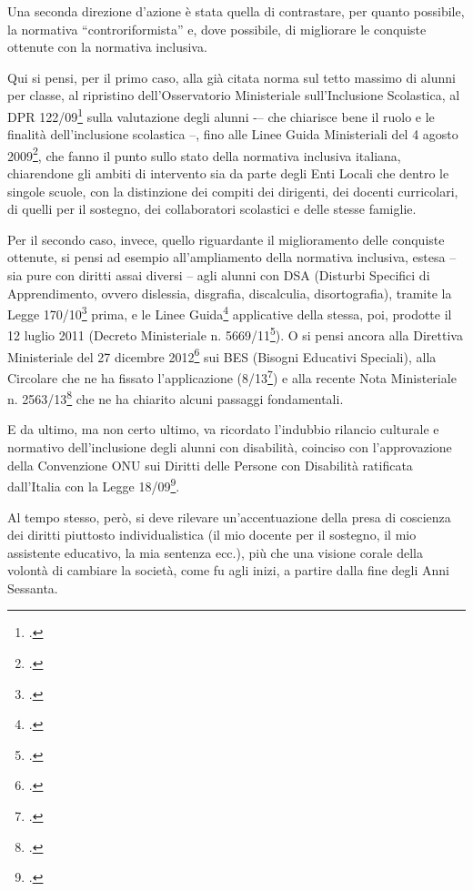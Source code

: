 Una seconda direzione d'azione è stata quella di contrastare, per quanto possibile, la normativa “controriformista” e, dove possibile, di migliorare le conquiste ottenute con la normativa inclusiva.

Qui si pensi, per il primo caso, alla già citata norma sul tetto massimo di alunni per classe, al ripristino dell'Osservatorio Ministeriale sull'Inclusione Scolastica, al DPR 122/09\footcite{DPR_122_2009} sulla valutazione degli alunni -– che chiarisce bene il ruolo e le finalità dell'inclusione scolastica --, fino alle Linee Guida Ministeriali del 4 agosto 2009\footcite{LineGuida2009}, che fanno il punto sullo stato della normativa inclusiva italiana, chiarendone gli ambiti di intervento sia da parte degli Enti Locali che dentro le singole scuole, con la distinzione dei compiti dei dirigenti, dei docenti curricolari, di quelli per il sostegno, dei collaboratori scolastici e delle stesse famiglie.

Per il secondo caso, invece, quello riguardante il miglioramento delle conquiste ottenute, si pensi ad esempio all'ampliamento della normativa inclusiva, estesa – sia pure con diritti assai diversi – agli alunni con DSA (Disturbi Specifici di Apprendimento, ovvero dislessia, disgrafia, discalculia, disortografia), tramite la Legge 170/10\footcite{legge170} prima, e le Linee Guida\footcite{LineGuida2011} applicative della stessa, poi, prodotte il 12 luglio 2011 (Decreto Ministeriale n. 5669/11\footcite{decreto5669_2011}). O si pensi ancora alla Direttiva Ministeriale del 27 dicembre 2012\footcite{dir27Dic2012} sui BES (Bisogni Educativi Speciali), alla Circolare che ne ha fissato l'applicazione (8/13\footcite{cm8_2013}) e alla recente Nota Ministeriale n. 2563/13\footcite{Nota_2563_2013} che ne ha chiarito alcuni passaggi fondamentali.

E da ultimo, ma non certo ultimo, va ricordato l'indubbio rilancio culturale e normativo dell'inclusione degli alunni con disabilità, coinciso con l'approvazione della Convenzione ONU  sui Diritti delle Persone con Disabilità ratificata dall'Italia con la Legge 18/09\footcite{Legge18_2009}.

Al tempo stesso, però, si deve rilevare un'accentuazione della presa di coscienza dei diritti piuttosto individualistica (il mio docente per il sostegno, il mio assistente educativo, la mia sentenza ecc.), più che una visione corale della volontà di cambiare la società, come fu agli inizi, a partire dalla fine degli Anni Sessanta.

